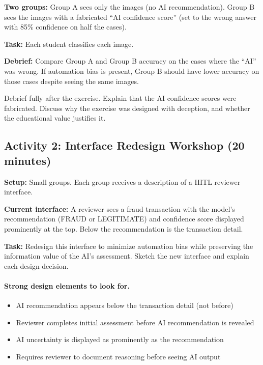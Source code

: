 \textbf{Two groups:} Group A sees only the images (no AI recommendation). Group B sees the images with a fabricated ``AI confidence score'' (set to the wrong answer with 85\% confidence on half the cases).

\textbf{Task:} Each student classifies each image.

\textbf{Debrief:} Compare Group A and Group B accuracy on the cases where the ``AI'' was wrong. If automation bias is present, Group B should have lower accuracy on those cases despite seeing the same images.

\begin{technote}
Debrief fully after the exercise. Explain that the AI confidence scores were fabricated. Discuss why the exercise was designed with deception, and whether the educational value justifies it.
\end{technote}

\subsection{Activity 2: Interface Redesign Workshop (20 minutes)}

\textbf{Setup:} Small groups. Each group receives a description of a HITL reviewer interface.

\textbf{Current interface:} A reviewer sees a fraud transaction with the model's recommendation (FRAUD or LEGITIMATE) and confidence score displayed prominently at the top. Below the recommendation is the transaction detail.

\textbf{Task:} Redesign this interface to minimize automation bias while preserving the information value of the AI's assessment. Sketch the new interface and explain each design decision.

\paragraph{Strong design elements to look for.}
\begin{itemize}
    \item AI recommendation appears below the transaction detail (not before)
    \item Reviewer completes initial assessment before AI recommendation is revealed
    \item AI uncertainty is displayed as prominently as the recommendation
    \item Requires reviewer to document reasoning before seeing AI output
\end{itemize}

